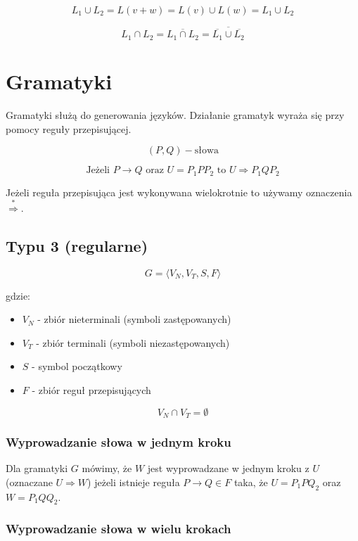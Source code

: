 \documentclass{../notatki}
\begin{document}
$$
L_1 \cup L_2 = L(v + w) = L(v) \cup L(w) = L_1 \cup L_2
$$

$$
L_1 \cap L_2 = \overline{L_1 \cap L_2} = \overline{\overline{L_1} \cup \overline{L_2}}
$$

\section{Gramatyki}

Gramatyki służą do generowania języków.
Działanie gramatyk wyraża się przy pomocy reguły przepisującej.

$$
(P, Q) - \text{słowa}
$$

$$
\text{Jeżeli } P \rightarrow Q \text{ oraz } U = P_1PP_2 \text{ to } U \Rightarrow P_1QP_2
$$

Jeżeli reguła przepisująca jest wykonywana wielokrotnie to używamy oznaczenia $\stackrel{*}{\Rightarrow}$.

\subsection{Typu 3 (regularne)}

$$
G = \langle V_N, V_T, S, F \rangle
$$

gdzie:

\begin{itemize}
    \item $V_N$ - zbiór nieterminali (symboli zastępowanych)
    \item $V_T$ - zbiór terminali (symboli niezastępowanych)
    \item $S$ - symbol początkowy
    \item $F$ - zbiór reguł przepisujących
\end{itemize}

$$
V_N \cap V_T = \emptyset
$$

\subsubsection{Wyprowadzanie słowa w jednym kroku}

Dla gramatyki $G$ mówimy, że $W$ jest wyprowadzane w jednym kroku z $U$ (oznaczane $U \Rightarrow W$) jeżeli istnieje reguła $P \rightarrow Q \in F$ taka, że $U = P_1PQ_2$ oraz $W = P_1QQ_2$.

\subsubsection{Wyprowadzanie słowa w wielu krokach}
\end{document}
